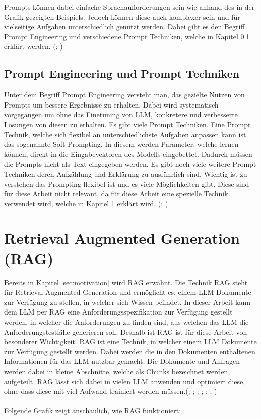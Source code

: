 \documentclass[12pt,toc=bib,toc=listof]{scrreprt}
\begin{document}
\noindent Prompts können dabei einfache Sprachaufforderungen sein wie anhand des in der Grafik gezeigten Beispiels. Jedoch können diese auch komplexer sein und für vielseitige Aufgaben unterschiedlich genutzt werden. Dabei gibt es den Begriff Prompt Engineering und verschiedene Prompt Techniken, welche in Kapitel \ref{sec:promptEngineeringUndPromptTechniken} erklärt werden. (\cite{Gu2023}; \cite{Liu2023})

\subsection{Prompt Engineering und Prompt Techniken} %
\label{sec:promptEngineeringUndPromptTechniken}
Unter dem Begriff Prompt Engineering versteht man, das gezielte Nutzen von Prompts um bessere Ergebnisse zu erhalten. Dabei wird systematisch vorgegangen um ohne das Finetuning von LLM, konkretere und verbesserte Lösungen von diesen zu erhalten. Es gibt viele Prompt Techniken. Eine Prompt Technik, welche sich flexibel an unterschiedlichste Aufgaben anpassen kann ist das sogenannte Soft Prompting. In diesem werden Parameter, welche lernen können, direkt in die Eingabevektoren des Modells eingebettet. Dadurch müssen die Prompts nicht als Text eingegeben werden. Es gibt noch viele weitere Prompt Techniken deren Aufzählung und Erklärung zu ausführlich sind. Wichtig ist zu verstehen das Prompting flexibel ist und es viele Möglichkeiten gibt. Diese sind für diese Arbeit nicht relevant, da für diese Arbeit eine spezielle Technik verwendet wird, welche in Kapitel \ref{sec:rag} erklärt wird. (\cite{Gu2023}; \cite{Liu2023})

\section{Retrieval Augmented Generation (RAG)} %
\label{sec:rag}
Bereits in Kapitel \ref{sec:motivation} wird RAG erwähnt. Die Technik RAG steht für Retrieval Augmented Generation und ermöglicht es, einem LLM Dokumente zur Verfügung zu stellen, in welcher sich Wissen befindet. In dieser Arbeit kann dem LLM per RAG eine Anforderungsspezifikation zur Verfügung gestellt werden, in welcher die Anforderungen zu finden sind, aus welchen das LLM die Anforderungstestfälle generieren soll. Deshalb ist RAG ist für diese Arbeit von besonderer Wichtigkeit. RAG ist eine Technik, in welcher einem LLM Dokumente zur Verfügung gestellt werden. Dabei werden die in den Dokumenten enthaltenen Informationen für das LLM nutzbar gemacht. Die Dokumente und Anfragen werden dabei in kleine Abschnitte, welche als Chunks bezeichnet werden, aufgeteilt. RAG lässt sich dabei in vielen LLM anwenden und optimiert diese, ohne dass diese mit viel Aufwand trainiert werden müssen.(\cite{Gao2024}; \cite{Honroth2024}; \cite{Lewis2021}; \cite{Miesle2023}; \cite{Salemi2024}; \cite{Schmid2024}; \cite{Wu2024})\\
\\
Folgende Grafik zeigt anschaulich, wie RAG funktioniert:
\end{document}
